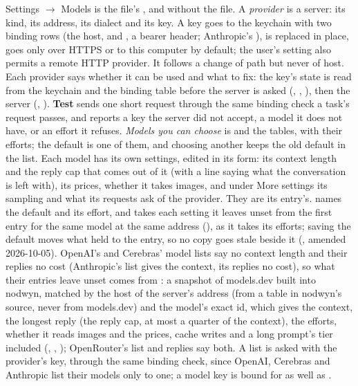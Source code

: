 Settings $\to$ Models is the file's \code{[servers]}, \code{[models]} and
\code{[control]} without the file. A \emph{provider} is a server: its kind, its
address, its dialect and its key. A key goes to the keychain with two binding
rows (the host,  and , a bearer header; Anthropic's
), is replaced in place, goes only
over HTTPS or to this computer by default; the user's
 setting also permits a remote HTTP provider.
It follows a change of path but never of host.
Each provider says whether it can be used and what to fix: the key's state is
read from the keychain and the binding table before the server is asked
(, , ), then the server
(, ). \textbf{Test} sends one short request
through the same binding check a task's request passes, and reports a key the
server did not accept, a model it does not have, or an effort it refuses.
\emph{Models you can choose} is \code{[control]} and the 
tables, with their efforts; the default is one of them, and choosing another
keeps the old default in the list. Each model has its own settings, edited in
its form: its context length and the reply cap that comes out of it (with a
line saying what the conversation is left with), its prices, whether it
takes images, and under More settings its sampling and what its requests ask
of the provider. They are its  entry's. \code{[control]} names
the default and its effort, and takes each setting it leaves unset from the
first entry for the same model at the same address (), as
it takes its efforts; saving the default moves what \code{[control]} held to
the entry, so no copy goes stale beside it (, amended 2026-10-05).
OpenAI's and Cerebras' model lists say no context length and their replies no
cost (Anthropic's list gives the context, its replies no cost), so what their entries leave unset comes from :
a snapshot of models.dev built into nodwyn, matched by the host of the server's
address (from a table in nodwyn's source, never from models.dev) and the
model's exact id, which gives the context, the longest reply (the reply cap,
at most a quarter of the context), the efforts, whether it reads images and
the prices, cache writes and a long prompt's tier included
(, , );
OpenRouter's list and replies say both. A list is asked with the provider's key, through the
same binding check, since OpenAI, Cerebras and Anthropic list their models only to one;
a model key is bound for  as well as .

